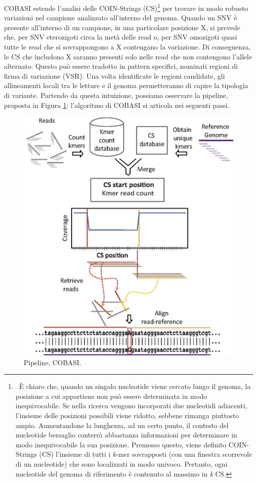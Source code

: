 \documentclass[../main.tex]{subfiles}
\begin{document}
COBASI estende l'analisi delle COIN-Strings (CS)\footnote{\ È chiaro che, quando un singolo nucleotide viene cercato lungo il genoma, la posizione a cui appartiene non può essere determinata in modo inequivocabile. Se nella ricerca vengono incorporati due nucleotidi adiacenti, l'insieme delle posizioni possibili viene ridotto, sebbene rimanga piuttosto ampio. Aumentandone la lunghezza, ad un certo punto, il contesto del nucleotide bersaglio conterrà abbastanza informazioni per determinare in modo inequivocabile la sua posizione. Premesso questo, viene definito COIN-Strings (CS) l'insieme di tutti i \textit{k}-mer sovrapposti (con una finestra scorrevole di un nucleotide) che sono localizzati in modo univoco. Pertanto, ogni nucleotide del genoma di riferimento è contenuto al massimo in \textit{k} CS.} per trovare in modo robusto variazioni nel campione analizzato all'interno del genoma. Quando un SNV è presente all'interno di un campione, in una particolare posizione X, si prevede che, per SNV eterozigoti circa la metà delle read o, per SNV omozigoti quasi tutte le read che si sovrappongono a X contengano la variazione. Di conseguenza, le CS che includono X saranno presenti solo nelle read che non contengono l'allele alternato. Questo può essere tradotto in pattern specifici, nominati regioni di firma di variazione (VSR). Una volta identificate le regioni candidate, gli allineamenti locali tra le letture e il genoma permetteranno di capire la tipologia di variante. Partendo da questa intuizione, possiamo osservare la pipeline, proposta in Figura \ref{fig:cobasi}: l'algoritmo di COBASI si articola nei seguenti passi.

 \begin{figure}[h!]
	\centering
  	\captionsetup{justification=centering}
  	\includegraphics[scale=.20]{images/cobasi_pipeline.png}
  	\caption{Pipeline, COBASI.}
  	\label{fig:cobasi}
\end{figure}
\end{document}
